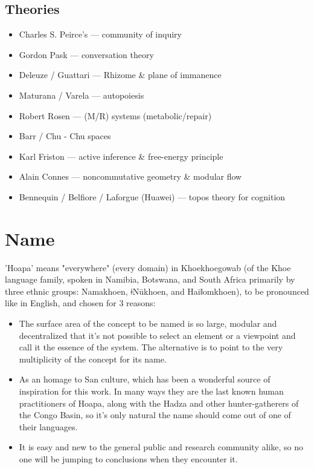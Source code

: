 \documentclass[11pt]{article}
\begin{document}
\subsection{Theories}

\begin{itemize}

\item Charles S. Peirce's --- community of inquiry

\item Gordon Pask --- conversation theory

\item Deleuze / Guattari --- Rhizome \& plane of immanence

\item Maturana / Varela --- autopoiesis

\item Robert Rosen --- (M/R) systems (metabolic/repair)

\item Barr / Chu - Chu spaces

\item Karl Friston --- active inference \& free-energy principle

\item Alain Connes --- noncommutative geometry \& modular flow

\item Bennequin / Belfiore / Laforgue (Huawei) --- topos theory for cognition

\end{itemize}

\section{Name}

'Hoapa' means "everywhere" (every domain) in Khoekhoegowab (of the Khoe language family, spoken in Namibia, Botswana, and South Africa primarily by three ethnic groups: Namakhoen, ǂNūkhoen, and Haiǁomkhoen), to be pronounced like in English, and chosen for 3 reasons:

\begin{itemize}

\item The surface area of the concept to be named is so large, modular and decentralized that it's not possible to select an element or a viewpoint and call it the essence of the system. The alternative is to point to the very multiplicity of the concept for its name.

\item As an homage to San culture, which has been a wonderful source of inspiration for this work. In many ways they are the last known human practitioners of Hoapa, along with the Hadza and other hunter-gatherers of the Congo Basin, so it's only natural the name should come out of one of their languages.

\item It is easy and new to the general public and research community alike, so no one will be jumping to conclusions when they encounter it.

\end{itemize}
\end{document}
